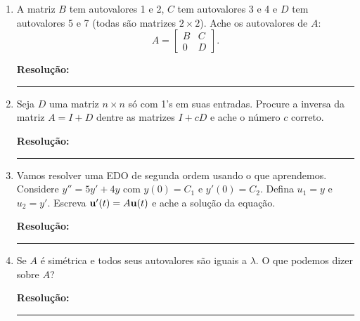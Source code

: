 \documentclass[leqno]{article}
\numberwithin{equation}{section}
\newenvironment{sol}
{
    \vspace{4mm}
    \noindent\textbf{Resolução:}
    \strut\newline
    \smallskip
    \hspace{-3.5mm}
}
{\noindent\rule{4cm}{.1mm}}
\begin{document}
\begin{enumerate}
\item A matriz $B$ tem autovalores 1 e 2, $C$ tem autovalores 3 e 4 e $D$ tem autovalores 5 e 7 (todas são matrizes $2 \times 2$). Ache os autovalores de $A$:
$$A = \begin{bmatrix}
B & C \\
0 & D
\end{bmatrix}.$$

\begin{sol} 
\end{sol} 


\item Seja $D$ uma matriz $n \times n$ só com 1's em suas entradas. Procure a inversa da matriz $A = I + D$ dentre as matrizes $I + cD$ e ache o número $c$ correto.

\begin{sol} 
\end{sol} 


\item Vamos resolver uma EDO de segunda ordem usando o que aprendemos. Considere $y'' = 5y' + 4y$ com $y(0) = C_1$ e $y'(0) = C_2$. Defina $u_1 = y$ e $u_2 = y'$. Escreva $\mathbf{u}'(t) = A\mathbf{u}(t)$ e ache a solução da equação.

\begin{sol} 
\end{sol} 


\item Se $A$ é simétrica e todos seus autovalores são iguais a $\lambda$. O que podemos dizer sobre $A$?

\begin{sol} 
\end{sol} 



\end{enumerate}
\end{document}

